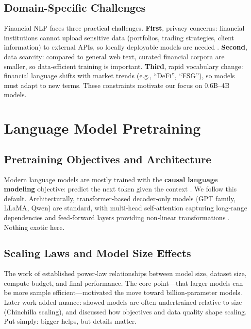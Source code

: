 \subsection{Domain-Specific Challenges}

Financial NLP faces three practical challenges. \textbf{First}, privacy concerns: financial institutions cannot upload sensitive data (portfolios, trading strategies, client information) to external APIs, so locally deployable models are needed \parencite{wu2023bloomberggpt}. \textbf{Second}, data scarcity: compared to general web text, curated financial corpora are smaller, so data-efficient training is important. \textbf{Third}, rapid vocabulary change: financial language shifts with market trends (e.g., ``DeFi'', ``ESG''), so models must adapt to new terms. These constraints motivate our focus on 0.6B–4B models.

\section{Language Model Pretraining}

\subsection{Pretraining Objectives and Architecture}

Modern language models are mostly trained with the \textbf{causal language modeling} objective: predict the next token given the context \parencite{radford2019language, brown2020language}. We follow this default. Architecturally, transformer‑based decoder‑only models (GPT family, LLaMA, Qwen) are standard, with multi‑head self‑attention capturing long‑range dependencies and feed‑forward layers providing non‑linear transformations \parencite{vaswani2017attention, touvron2023llama}. Nothing exotic here.

\subsection{Scaling Laws and Model Size Effects}

The work of \textcite{kaplan2020scaling} established power‑law relationships between model size, dataset size, compute budget, and final performance. The core point—that larger models can be more sample efficient—motivated the move toward billion‑parameter models. Later work added nuance: \textcite{hoffmann2022training} showed models are often undertrained relative to size (Chinchilla scaling), and \textcite{tay2022ul2} discussed how objectives and data quality shape scaling. Put simply: bigger helps, but details matter.

